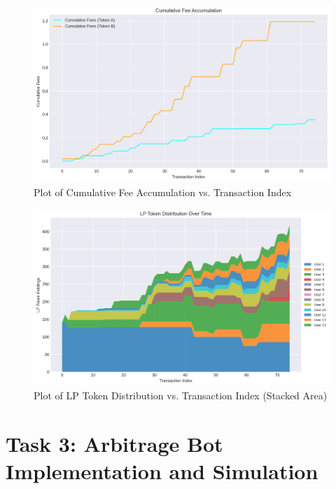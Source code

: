\documentclass[12pt]{article}
\begin{document}
\begin{figure}[H]
    \centering
    \includegraphics[width=\textwidth]{../task2_plots/fee_accumulation.png}
    \caption{Plot of Cumulative Fee Accumulation vs. Transaction Index}
    \label{fig:fees}
\end{figure}

\begin{figure}[H]
    \centering
    \includegraphics[width=\textwidth]{../task2_plots/lp_distribution.png}
    \caption{Plot of LP Token Distribution vs. Transaction Index (Stacked Area)}
    \label{fig:lp_dist}
\end{figure}


\section{Task 3: Arbitrage Bot Implementation and Simulation}
\end{document}
